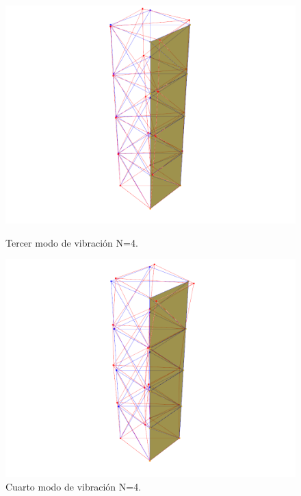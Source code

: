 \begin{figure}[H]
    \begin{minipage}[b]{0.5\textwidth}
        \centering
        \includegraphics[width=\textwidth]{FOTOS/mod3_4.png}
        \caption{Tercer modo de vibración N=4.}
    \end{minipage}
    \hfill
    \begin{minipage}[b]{0.5\textwidth}
        \centering
        \includegraphics[width=\textwidth]{FOTOS/mod4_4.png}
        \caption{Cuarto modo de vibración N=4.}
    \end{minipage}
\end{figure}


